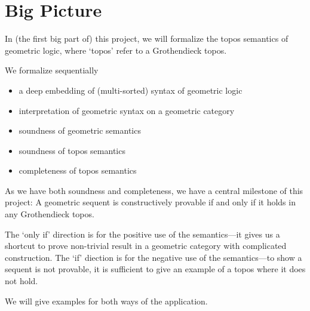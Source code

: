 %


\chapter{Big Picture}


In (the first big part of) this project, we will formalize the topos semantics of geometric logic, where `topos' refer to a Grothendieck topos.

We formalize sequentially 
\begin{itemize}
  \item a deep embedding of (multi-sorted) syntax of geometric logic
  \item interpretation of geometric syntax on a geometric category
  \item soundness of geometric semantics
  \item soundness of topos semantics
  \item completeness of topos semantics
\end{itemize}

As we have both soundness and completeness, we have a central milestone of this project:
A geometric sequent is constructively provable if and only if it holds in any Grothendieck topos.

The `only if' direction is for the positive use of the semantics---it gives us a shortcut to prove non-trivial result in a geometric category with complicated construction.
The `if' diection is for the negative use of the semantics---to show a sequent is not provable, it is sufficient to give an example of a topos where it does not hold.

We will give examples for both ways of the application.




